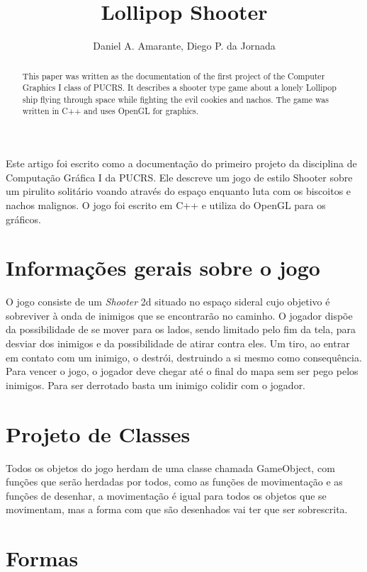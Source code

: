 \documentclass[12pt]{article}
\title{Lollipop Shooter}
\author{Daniel A. Amarante, Diego P. da Jornada}
\begin{document}
 

\maketitle

\begin{abstract}
  This paper was written as the documentation of the first project of the Computer Graphics I class of PUCRS. It describes a shooter type game about a lonely Lollipop ship flying through space while fighting the evil cookies and nachos. The game was written in C++ and uses OpenGL for graphics.
\end{abstract}
     
\begin{resumo} 
  Este artigo foi escrito como a documentação do primeiro projeto da disciplina de Computação Gráfica I da PUCRS. Ele descreve um jogo de estilo Shooter sobre um pirulito solitário voando através do espaço enquanto luta com os biscoitos e nachos malignos. O jogo foi escrito em C++ e utiliza do OpenGL para os gráficos.
\end{resumo}


\section{Informações gerais sobre o jogo}

O jogo consiste de um \emph{Shooter} 2d situado no espaço sideral cujo objetivo é sobreviver à onda de inimigos que se encontrarão no caminho. O jogador dispõe da possibilidade de se mover para os lados, sendo limitado pelo fim da tela, para desviar dos inimigos e da possibilidade de atirar contra eles. Um tiro, ao entrar em contato com um inimigo, o destrói, destruindo a si mesmo como consequência. Para vencer o jogo, o jogador deve chegar até o final do mapa sem ser pego pelos inimigos. Para ser derrotado basta um inimigo colidir com o jogador.

\section{Projeto de Classes}

Todos os objetos do jogo herdam de uma classe chamada GameObject, com funções que serão herdadas por todos, como as funções de movimentação e as funções de desenhar, a movimentação é igual para todos os objetos que se movimentam, mas a forma com que são desenhados vai ter que ser sobrescrita.

\section{Formas}
\end{document}
